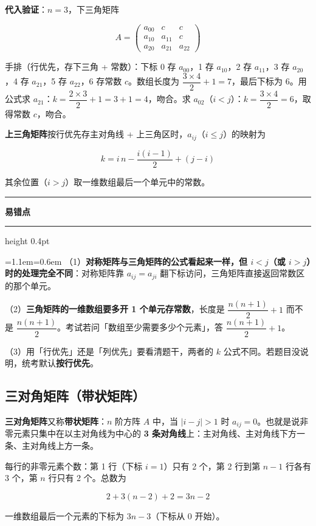 \documentclass[11pt,openany,UTF8]{ctexbook}
\newcommand{\callouthead}[2]{%
  \par\addvspace{7pt}\noindent
  {\color{#1}\rule[-0.15em]{3pt}{1.05em}}\hspace{0.5em}%
  {\bfseries\color{#1}#2}\par\nobreak\vspace{-0.35em}%
  {\color{rulesep}\hrule height 0.4pt}\nobreak\vspace{0.45em}%
  \begingroup\small\setlength{\parindent}{0pt}%
  \leftskip=1.1em\rightskip=0.6em\noindent\ignorespaces}
\newcommand{\calloutend}{\par\endgroup\addvspace{7pt}}
\newenvironment{callwarn}[1]{\callouthead{warnbar}{#1}}{\calloutend}
\begin{document}
\textbf{代入验证}：$n = 3$，下三角矩阵

\[A = \begin{pmatrix} a_{00} & c & c \\ a_{10} & a_{11} & c \\ a_{20} & a_{21} & a_{22} \end{pmatrix}\]

手排（行优先，存下三角 + 常数）：下标 0 存 $a_{00}$，1 存 $a_{10}$，2 存 $a_{11}$，3 存 $a_{20}$，4 存 $a_{21}$，5 存 $a_{22}$，6 存常数 $c$。数组长度为 $\dfrac{3 \times 4}{2} + 1 = 7$，最后下标为 6。用公式求 $a_{21}$：$k = \dfrac{2 \times 3}{2} + 1 = 3 + 1 = 4$，吻合。求 $a_{02}$（$i < j$）：$k = \dfrac{3 \times 4}{2} = 6$，取得常数 $c$，吻合。

\textbf{上三角矩阵}按行优先存主对角线 + 上三角区时，$a_{ij}$（$i \le j$）的映射为

\[k = i\,n - \frac{i(i-1)}{2} + (j - i)\]

其余位置（$i > j$）取一维数组最后一个单元中的常数。

\begin{callwarn}{易错点}
（1）\textbf{对称矩阵与三角矩阵的公式看起来一样，但 $i < j$（或 $i > j$）时的处理完全不同}：对称矩阵靠 $a_{ij}=a_{ji}$ 翻下标访问，三角矩阵直接返回常数区的那个单元。

（2）\textbf{三角矩阵的一维数组要多开 1 个单元存常数}，长度是 $\dfrac{n(n+1)}{2} + 1$ 而不是 $\dfrac{n(n+1)}{2}$。考试若问「数组至少需要多少个元素」，答 $\dfrac{n(n+1)}{2}+1$。

（3）用「行优先」还是「列优先」要看清题干，两者的 $k$ 公式不同。若题目没说明，统考默认\textbf{按行优先}。

\end{callwarn}

\subsection{三对角矩阵（带状矩阵）}

\textbf{三对角矩阵}又称\textbf{带状矩阵}：$n$ 阶方阵 $A$ 中，当 $|i - j| > 1$ 时 $a_{ij} = 0$。也就是说非零元素只集中在以主对角线为中心的 \textbf{3 条对角线}上：主对角线、主对角线下方一条、主对角线上方一条。

每行的非零元素个数：第 1 行（下标 $i=1$）只有 2 个，第 2 行到第 $n-1$ 行各有 3 个，第 $n$ 行只有 2 个。总数为

\[2 + 3(n-2) + 2 = 3n - 2\]

一维数组最后一个元素的下标为 $3n - 3$（下标从 0 开始）。
\end{document}
